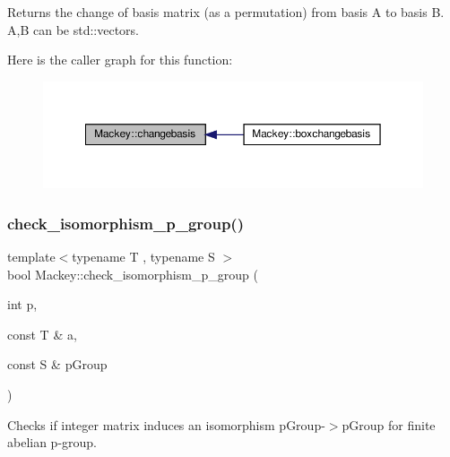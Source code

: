 Returns the change of basis matrix (as a permutation) from basis A to basis B. A,B can be std\+::vector\textquotesingle{}s. 

Here is the caller graph for this function\+:\nopagebreak
\begin{figure}[H]
\begin{center}
\leavevmode
\includegraphics[width=350pt]{namespaceMackey_aa2823da3a4b93dca63e00e50a6bc9fdf_icgraph}
\end{center}
\end{figure}
\mbox{\label{namespaceMackey_aa96cf972d89b207ce6709e867f760f37}} 
\subsubsection{\texorpdfstring{check\+\_\+isomorphism\+\_\+p\+\_\+group()}{check\_isomorphism\_p\_group()}}
{\footnotesize\ttfamily template$<$typename T , typename S $>$ \\
bool Mackey\+::check\+\_\+isomorphism\+\_\+p\+\_\+group (\begin{DoxyParamCaption}\item[{int}]{p,  }\item[{const T \&}]{a,  }\item[{const S \&}]{p\+Group }\end{DoxyParamCaption})}



Checks if integer matrix induces an isomorphism p\+Group-\/$>$p\+Group for finite abelian p-\/group. 

